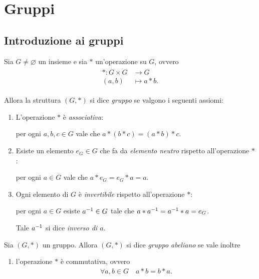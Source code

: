 \chapter{Gruppi}

\section{Introduzione ai gruppi}

\begin{definition}
    [Gruppo] \label{def:gruppo}
    Sia $G \neq \varnothing$ un insieme e sia $*$ un'operazione su $G$, ovvero \begin{align} \begin{split}
        * : G  \times  G &\to       G  \\
            (a, b)       &\mapsto  a*b.
    \end{split} \end{align}

    Allora la struttura $(G, *)$ si dice \emph{gruppo} se valgono i seguenti assiomi: \begin{enumerate}[label={(G\arabic*)}]
        \item \label{def:gruppo:ass} L'operazione $*$ è \emph{associativa}:
        
        per ogni $a, b, c \in G$ vale che $a * (b * c) = (a * b) * c$.
        \item Esiste un elemento $e_G \in G$ che fa da \emph{elemento neutro} rispetto all'operazione $*$:
        
        per ogni $a \in G$ vale che $a * e_G = e_G * a = a$.
        \item Ogni elemento di $G$ è \emph{invertibile} rispetto all'operazione $*$:
        
        per ogni $a \in G$ esiste $a^{-1} \in G$ tale che $a * a^{-1} = a^{-1} * a = e_G$.
        
        Tale $a^{-1}$ si dice \emph{inverso di $a$}.
    \end{enumerate}
\end{definition}

\begin{definition}
     \label{def:gruppo abeliano}
    Sia  $(G, *)$ un gruppo.
    Allora $(G, *)$ si dice \emph{gruppo abeliano} se vale inoltre \begin{enumerate}[label={(G\arabic*)}, start=4]
        \item l'operazione $*$ è commutativa, ovvero \begin{align*}
            \forall a, b \in G \quad a * b = b * a.
        \end{align*}
    \end{enumerate}
\end{definition}


